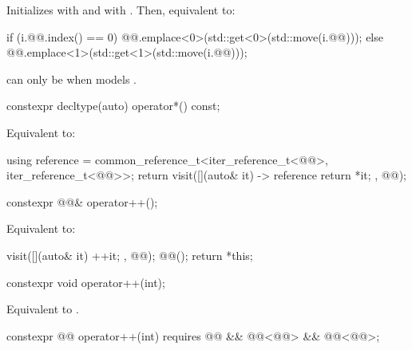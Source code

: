 \begin{itemdescr}
\pnum
\effects
Initializes  with
 and
 with .
Then, equivalent to:
\begin{codeblock}
if (i.@@.index() == 0)
  @@.emplace<0>(std::get<0>(std::move(i.@@)));
else
  @@.emplace<1>(std::get<1>(std::move(i.@@)));
\end{codeblock}

\pnum
\begin{note}
 can only be 
when  models .
\end{note}
\end{itemdescr}

\begin{itemdecl}
constexpr decltype(auto) operator*() const;
\end{itemdecl}

\begin{itemdescr}
\pnum
\effects
Equivalent to:
\begin{codeblock}
using reference =
  common_reference_t<iter_reference_t<@@>, iter_reference_t<@@>>;
return visit([](auto& it) -> reference { return *it; }, @@);
\end{codeblock}
\end{itemdescr}

\begin{itemdecl}
constexpr @@& operator++();
\end{itemdecl}

\begin{itemdescr}
\pnum
\effects
Equivalent to:
\begin{codeblock}
visit([](auto& it){ ++it; }, @@);
@@();
return *this;
\end{codeblock}
\end{itemdescr}

\begin{itemdecl}
constexpr void operator++(int);
\end{itemdecl}

\begin{itemdescr}
\pnum
\effects
Equivalent to .
\end{itemdescr}

\begin{itemdecl}
constexpr @@ operator++(int)
  requires @@ && @@<@@> && @@<@@>;
\end{itemdecl}

